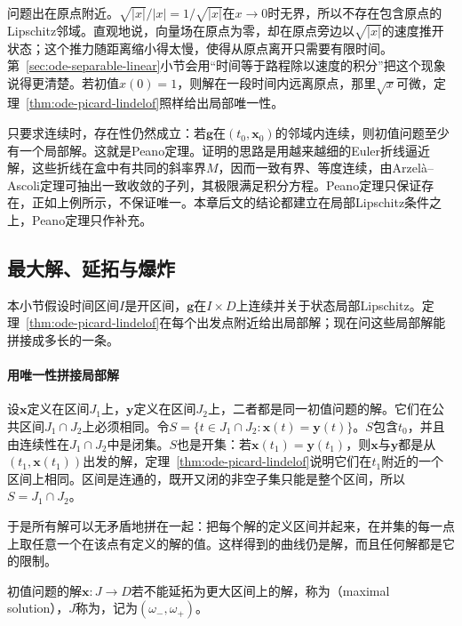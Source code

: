 问题出在原点附近。$\sqrt{|x|}/|x|=1/\sqrt{|x|}$在$x\to0$时无界，所以不存在包含原点的Lipschitz邻域。直观地说，向量场在原点为零，却在原点旁边以$\sqrt{|x|}$的速度推开状态；这个推力随距离缩小得太慢，使得从原点离开只需要有限时间。第~\ref{sec:ode-separable-linear}小节会用“时间等于路程除以速度的积分”把这个现象说得更清楚。若初值$x(0)=1$，则解在一段时间内远离原点，那里$\sqrt{x}$可微，定理~\ref{thm:ode-picard-lindelof}照样给出局部唯一性。

只要求连续时，存在性仍然成立：若$\bm g$在$(t_0,\bm x_0)$的邻域内连续，则初值问题至少有一个局部解。这就是Peano定理。证明的思路是用越来越细的Euler折线逼近解，这些折线在盒中有共同的斜率界$M$，因而一致有界、等度连续，由Arzelà--Ascoli定理可抽出一致收敛的子列，其极限满足积分方程。Peano定理只保证存在，正如上例所示，不保证唯一。本章后文的结论都建立在局部Lipschitz条件之上，Peano定理只作补充。

\subsection{最大解、延拓与爆炸}
\label{sec:ode-maximal-solutions}

本小节假设时间区间$I$是开区间，$\bm g$在$I\times D$上连续并关于状态局部Lipschitz。定理~\ref{thm:ode-picard-lindelof}在每个出发点附近给出局部解；现在问这些局部解能拼接成多长的一条。

\paragraph{用唯一性拼接局部解}
设$\bm x$定义在区间$J_1$上，$\bm y$定义在区间$J_2$上，二者都是同一初值问题的解。它们在公共区间$J_1\cap J_2$上必须相同。令$S=\{t\in J_1\cap J_2:\bm x(t)=\bm y(t)\}$。$S$包含$t_0$，并且由连续性在$J_1\cap J_2$中是闭集。$S$也是开集：若$\bm x(t_1)=\bm y(t_1)$，则$\bm x$与$\bm y$都是从$(t_1,\bm x(t_1))$出发的解，定理~\ref{thm:ode-picard-lindelof}说明它们在$t_1$附近的一个区间上相同。区间是连通的，既开又闭的非空子集只能是整个区间，所以$S=J_1\cap J_2$。

于是所有解可以无矛盾地拼在一起：把每个解的定义区间并起来，在并集的每一点上取任意一个在该点有定义的解的值。这样得到的曲线仍是解，而且任何解都是它的限制。

\begin{definition}[最大解]
  \label{def:ode-maximal-solution}
  初值问题的解$\bm x:J\to D$若不能延拓为更大区间上的解，称为（maximal solution），$J$称为，记为$(\omega_-,\omega_+)$。
\end{definition}

